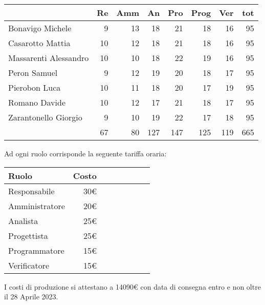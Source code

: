 \begin{table}[H]
    \begin{tabularx}{\linewidth}{X|rrrrrrr}
    \rowcolor{gray!30}& Re & Amm & An & Pro & Prog & Ver & tot \\
    \hline
    Bonavigo Michele                        & 9 & 13 & 18 & 21 & 18 & 16 & 95 \\
    \rowcolor{gray!10}Casarotto Mattia      & 10 & 12 & 18 & 21 & 18 & 16 & 95 \\
    Massarenti Alessandro                   & 10 & 10 & 18 & 22 & 19 & 16 & 95 \\
    \rowcolor{gray!10}Peron Samuel          & 9 & 12 & 19 & 20 & 18 & 17 & 95 \\
    Pierobon Luca                           & 10 & 11 & 18 & 20 & 17 & 19 & 95 \\
    \rowcolor{gray!10}Romano Davide         & 10 & 12 & 17 & 21 & 18 & 17 & 95 \\
    Zarantonello Giorgio                    & 9 & 10 & 19 & 22 & 17 & 18 & 95 \\
    \hline                                  & 67 & 80 & 127 & 147 & 125 & 119 & 665 \\ 
    \end{tabularx}
\end{table}

Ad ogni ruolo corrisponde la seguente tariffa oraria:

\begin{table}[H]
    \begin{tabularx}{\linewidth}{X|rrrrrrr}
    \rowcolor{gray!30}Ruolo & Costo \\
    \hline
    Responsabile                       & 30€ \\
    \rowcolor{gray!10}Amministratore   & 20€ \\
    Analista                           & 25€ \\
    \rowcolor{gray!10}Progettista       & 25€ \\
    Programmatore                       & 15€ \\
    \rowcolor{gray!10}Verificatore      & 15€ \\
    \hline
    \end{tabularx}
\end{table}

I costi di produzione si attestano a 14090€ con data di consegna entro e non oltre il 28 Aprile 2023.













